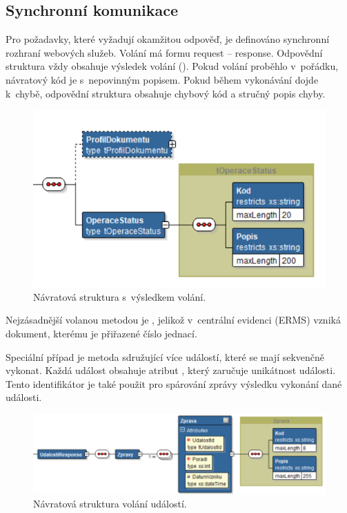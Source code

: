 \documentclass[
  master,
  field=ainfp,
  biblatex,
  language=czech,
  glossaries,
  theorems=false,
  index
]{kidiplom}
\begin{document}
\subsection{Synchronní komunikace}
Pro požadavky, které vyžadují okamžitou odpověď, je definováno synchronní rozhraní webových služeb. Volání má formu request -- response. Odpovědní struktura vždy obsahuje výsledek volání (). Pokud volání proběhlo v~pořádku, návratový kód je  s~nepovinným popisem. Pokud během vykonávání dojde k~chybě, odpovědní struktura obsahuje chybový kód a stručný popis chyby.

\begin{figure}[h]
  \centerline{\includegraphics[width=0.9\linewidth]{./images/OperaceStatus.png}} 
  \caption{Návratová struktura s~výsledkem volání.} 
\end{figure}

Nejzásadnější volanou metodou je , jelikož v~centrální evidenci (ERMS) vzniká dokument, kterému je přiřazené číslo jednací.

Speciální případ je metoda  sdružující více událostí, které se mají sekvenčně vykonat. Každá událost obsahuje atribut , který zaručuje unikátnost události. Tento identifikátor je také použit pro spárování zprávy výsledku vykonání dané události.

\begin{figure}[h]
  \centerline{\includegraphics[width=0.9\linewidth]{./images/UdalostiResponse.png}} 
  \caption{Návratová struktura volání událostí.} 
\end{figure}
\end{document}
